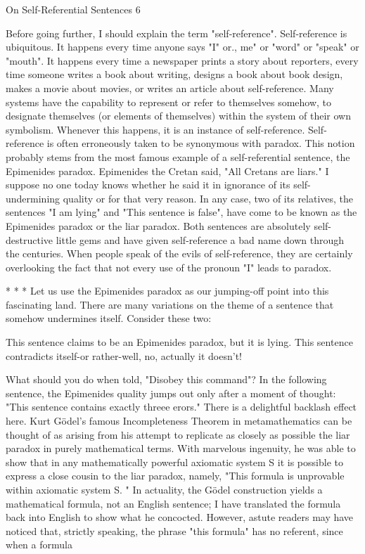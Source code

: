 On Self-Referential Sentences                                                              6

        Before going further, I should explain the term "self-reference". Self-reference is
ubiquitous. It happens every time anyone says "I" or., me" or "word" or "speak" or
"mouth". It happens every time a newspaper prints a story about reporters, every time
someone writes a book about writing, designs a book about book design, makes a movie
about movies, or writes an article about self-reference. Many systems have the capability
to represent or refer to themselves somehow, to designate themselves (or elements of
themselves) within the system of their own symbolism. Whenever this happens, it is an
instance of self-reference.
        Self-reference is often erroneously taken to be synonymous with paradox. This
notion probably stems from the most famous example of a self-referential sentence, the
Epimenides paradox. Epimenides the Cretan said, "All Cretans are liars." I suppose no
one today knows whether he said it in ignorance of its self-undermining quality or for
that very reason. In any case, two of its relatives, the sentences "I am lying" and "This
sentence is false", have come to be known as the Epimenides paradox or the liar paradox.
Both sentences are absolutely self-destructive little gems and have given self-reference a
bad name down through the centuries. When people speak of the evils of self-reference,
they are certainly overlooking the fact that not every use of the pronoun "I" leads to
paradox.

                                      *       *       *
         Let us use the Epimenides paradox as our jumping-off point into this fascinating
land. There are many variations on the theme of a sentence that somehow undermines
itself. Consider these two:

       This sentence claims to be an Epimenides paradox, but it is lying.
       This sentence contradicts itself-or rather-well, no, actually it doesn't!

        What should you do when told, "Disobey this command"? In the following
sentence, the Epimenides quality jumps out only after a moment of thought: "This
sentence contains exactly threee erors." There is a delightful backlash effect here.
        Kurt Gödel’s famous Incompleteness Theorem in metamathematics can be
thought of as arising from his attempt to replicate as closely as possible the liar paradox
in purely mathematical terms. With marvelous ingenuity, he was able to show that in any
mathematically powerful axiomatic system S it is possible to express a close cousin to the
liar paradox, namely, "This formula is unprovable within axiomatic system S. "
        In actuality, the Gödel construction yields a mathematical formula, not an English
sentence; I have translated the formula back into English to show what he concocted.
However, astute readers may have noticed that, strictly speaking, the phrase "this
formula" has no referent, since when a formula




